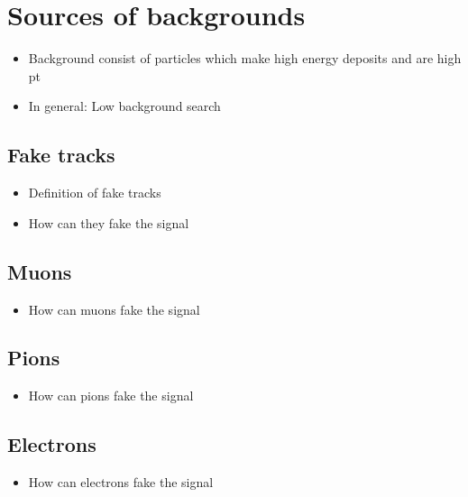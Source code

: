 \section{Sources of backgrounds}
\label{sec:SourcesOfBackgrounds}
\begin{itemize}
\item Background consist of particles which make high energy deposits and are high pt
\item In general: Low background search
\end{itemize}
\subsection{Fake tracks}
\begin{itemize}
\item Definition of fake tracks
\item How can they fake the signal
\end{itemize}
\subsection{Muons}
\begin{itemize}
\item How can muons fake the signal
\end{itemize}
\subsection{Pions}
\begin{itemize}
\item How can pions fake the signal
\end{itemize}
\subsection{Electrons}
\begin{itemize}
\item How can electrons fake the signal
\end{itemize}
